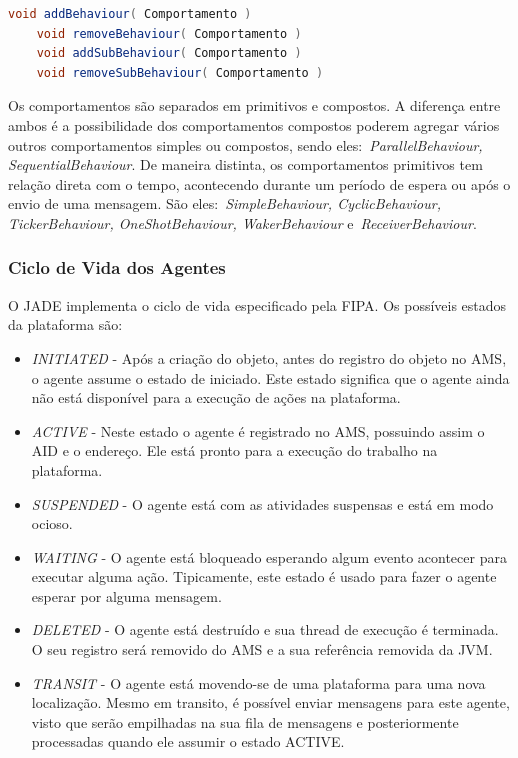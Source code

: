 \begin{lstlisting}[language=java,label=code:exemplo-register,caption=Exemplo de registro de comportamento nos agentes.]
	void addBehaviour( Comportamento )
	void removeBehaviour( Comportamento )
	void addSubBehaviour( Comportamento )
	void removeSubBehaviour( Comportamento )
\end{lstlisting}

Os comportamentos são separados em primitivos e compostos. A diferença entre ambos é a possibilidade dos comportamentos compostos poderem agregar vários outros comportamentos simples ou compostos, sendo eles:~\emph{ParallelBehaviour, SequentialBehaviour}. De maneira distinta, os comportamentos primitivos tem relação direta com o tempo, acontecendo durante um período de espera ou após o envio de uma mensagem. São eles:~\emph{SimpleBehaviour, CyclicBehaviour, TickerBehaviour, OneShotBehaviour, WakerBehaviour} e~\emph{ReceiverBehaviour}.

\subsubsection{Ciclo de Vida dos Agentes}
O JADE implementa o ciclo de vida especificado pela FIPA. Os possíveis estados da plataforma são:

\begin{itemize}
	\item \emph{INITIATED} - Após a criação do objeto, antes do registro do objeto no AMS, o agente assume o estado de iniciado. Este estado significa que o agente ainda não está disponível para a execução de ações na  plataforma.
	\item \emph{ACTIVE} - Neste estado o agente é registrado no AMS, possuindo assim o AID e o endereço. Ele está pronto para a execução do trabalho na plataforma.
	\item \emph{SUSPENDED} - O agente está com as atividades suspensas e está em modo ocioso.
	\item \emph{WAITING} - O agente está bloqueado esperando algum evento acontecer para executar alguma ação. Tipicamente, este estado é usado para fazer o agente esperar por alguma mensagem.
	\item \emph{DELETED} - O agente está destruído e sua thread de execução é terminada. O seu registro será removido do AMS e a sua referência removida da JVM.
	\item \emph{TRANSIT} - O agente está movendo-se de uma plataforma para uma nova localização. Mesmo em transito, é possível enviar mensagens para este agente, visto que serão empilhadas na sua fila de mensagens e posteriormente processadas quando ele assumir o estado ACTIVE.
\end{itemize}

